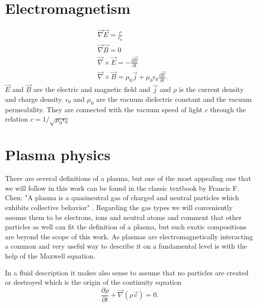 \section{Electromagnetism}

\begin{align}
\label{eqn:Maxwell}
&\vec{\nabla} \vec{E} = \frac{\rho}{\epsilon_0}\\	
&\vec{\nabla}\vec{B} =0\\
	&\vec{\nabla}\times\vec{E}=-\frac{\partial \vec{B}}{\partial t}\\
 &\vec{\nabla}\times \vec{B}=\mu_0\vec{j}+\mu_0\epsilon_0\frac{\partial \vec{E}}{\partial t}.
\end{align}
$\vec{E}$ and $\vec{B}$ are the electric and magnetic field and  $\vec{j}$ and $\rho$ is the current density and charge density.
$\epsilon_0$ and $\mu_0$ are the vacuum  dielectric constant and the vacuum permeability. They are connected with the vacuum speed of light $c$ through the relation $c=1/\sqrt{\mu_0 \epsilon_0}$

\section{Plasma physics}
There are several definitions of a plasma, but one of the most appealing one that we will follow in this work can be found in the classic 
textbook by Francis F. Chen:
"A plasma is a quasineutral gas of charged and neutral particles which
exhibits collective behavior" \cite{Chen_book_Plasma}.
Regarding the gas types we will conveniently assume them to be electrons, ions and neutral atoms and comment that other particles as well can fit the definition of a plasma, but such exotic compositions are beyond the scope of this work.
As plasmas are electromagnetically interacting a common and very useful way to describe it on a fundamental level is with the help of the Maxwell equation.

In a fluid description it makes also sense to assume that no particles are created or destroyed which is the origin of the 
continuity equation 
\begin{equation}
\frac{\partial \rho}{\partial t} + \vec{\nabla}(\rho \vec{v})=0.
\end{equation}




